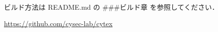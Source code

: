 \documentclass{article}
\begin{document}
ビルド方法は README.md の \#\#\#ビルド章 を参照してください．

\url{https://github.com/cysec-lab/cytex}
\end{document}
